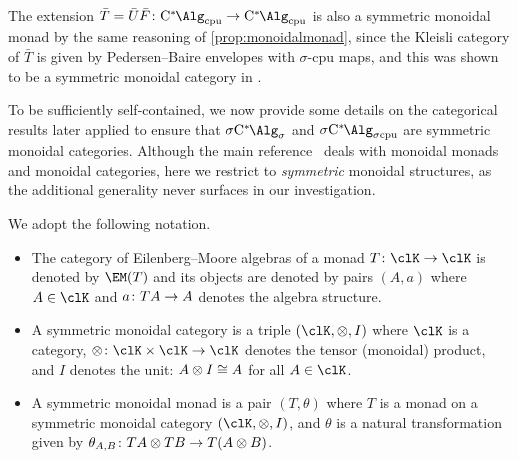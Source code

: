 
\begin{remark}\label{rem:monoidalmonad_cpu}
	The extension $\bar T = \bar U \bar F\colon \Calgcpu \to \Calgcpu$ is also a symmetric monoidal monad by the same reasoning of \cref{prop:monoidalmonad}, since the Kleisli category of $\bar T$ is given by Pedersen--Baire envelopes with $\sigma$-cpu maps, and this was shown to be a symmetric monoidal category in \cite[Remark 5.3.3]{fritz2025categories}.
\end{remark}

To be sufficiently self-contained, we now provide some details on the categorical results later applied to ensure that $\SigmaC$ and $\SigmaCcpu$ are symmetric monoidal categories.
Although the main reference~\cite{seal2013tensors} deals with monoidal monads and monoidal categories, here we restrict to \emph{symmetric} monoidal structures, as the additional generality never surfaces in our investigation.
\begin{notation} We adopt the following notation.
	\begin{itemize}
		\item The category of Eilenberg--Moore algebras of a monad $T\colon \clK\to \clK$ is denoted by $\EM(T)$ and its objects are denoted by pairs $(A,a)$ where $\A\in \clK$ and $a\colon T{A} \to {A}$ denotes the algebra structure.
		\item A symmetric monoidal category is a triple $(\clK, \otimes , I)$ where $\clK$ is a category, $\otimes \colon \clK \times \clK \to \clK$ denotes the tensor (monoidal) product, and $I$ denotes the unit: ${A} \otimes I \cong {A}$ for all $\A \in \clK$.
		\item A symmetric monoidal monad is a pair $(T,\theta)$ where $T$ is a monad on a symmetric monoidal category $(\clK,\otimes ,I)$, and $\theta$ is a natural transformation given by $\theta_{{A},{B}} \colon T{A} \otimes T{B} \to T({A}\otimes {B})$.
	\end{itemize}
\end{notation}



